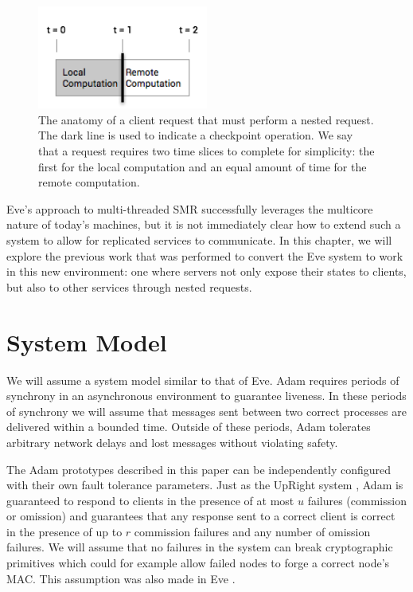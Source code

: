 \documentclass[11pt, oneside]{report}
\begin{document}
\begin{figure}[h]
\centering
\includegraphics[width=0.5\textwidth]{RequestAnatomy.png}
\caption{\label{anatomy}The anatomy of a client request that must perform a nested request. The dark line is used to indicate a checkpoint operation. We say that a request requires two time slices to complete for simplicity: the first for the local computation and an equal amount of time for the remote computation.}
\end{figure}

Eve's approach to multi-threaded SMR successfully leverages the multicore nature of today's machines, but it is not immediately clear how to extend such a system to allow for replicated services to communicate. 
In this chapter, we will explore the previous work that was performed to convert the Eve system to work in this new environment: one where servers not only expose their states to clients, but also to other services through nested requests.

\section{System Model}
We will assume a system model similar to that of Eve. 
Adam requires periods of synchrony in an asynchronous environment to guarantee liveness. 
In these periods of synchrony we will assume that messages sent between two correct processes are delivered within a bounded time. 
Outside of these periods, Adam tolerates arbitrary network delays and lost messages without violating safety.

The Adam prototypes described in this paper can be independently configured with their own fault tolerance parameters. 
Just as the UpRight system \cite{upRight}, Adam is guaranteed to respond to clients in the presence of at most $u$ failures (commission or omission) and guarantees that any response sent to a correct client is correct in the presence of up to $r$ commission failures and any number of omission failures. 
We will assume that no failures in the system can break cryptographic primitives which could for example allow failed nodes to forge a correct node's MAC. This assumption was also made in Eve \cite{manosThesis, eve}.
\end{document}
